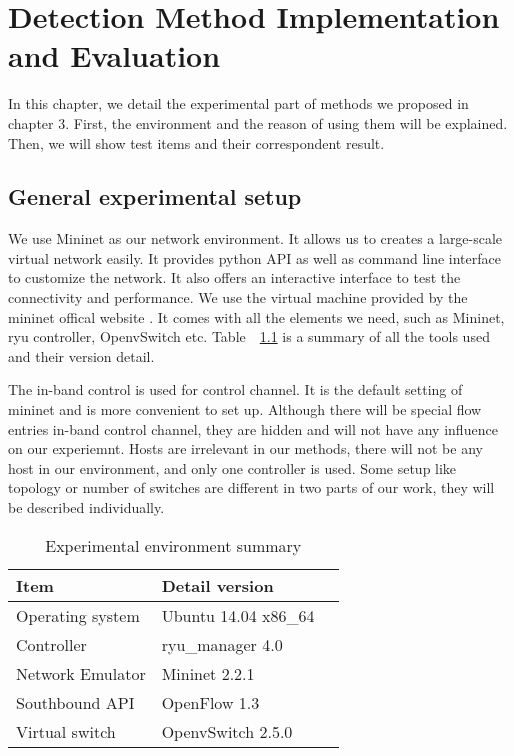 \chapter{Detection Method Implementation and Evaluation}
In this chapter, we detail the experimental part of methods we proposed in chapter 3. First, the environment and the reason of using them will be explained. Then, we will show test items and their correspondent result.

\section{General experimental setup}
We use Mininet as our network environment. It allows us to creates a large-scale virtual network easily. 
It provides python API as well as command line interface to customize the network. It also offers an interactive interface to test the connectivity and performance. We use the virtual machine provided by the mininet offical website \cite{Mininet}. It comes with all the elements we need, such as Mininet, ryu controller, OpenvSwitch etc. Table~~\ref{table:Experiment_table} is a summary of all the tools used and their version detail. 

The in-band control is used for control channel. It is the default setting of mininet and is more convenient to set up. Although there will be special flow entries in-band control channel, they are hidden and will not have any influence on our experiemnt. Hosts are irrelevant in our methods, there will not be any host in our environment, and only one controller is used. Some setup like topology or number of switches are different in two parts of our work, they will be described individually.

\begin{table}[H]
\centering
\caption{Experimental environment summary}
\begin{tabular}{|l|p{4cm}|p{4.5cm}}
\hline Item & Detail version \\
\hline Operating system & Ubuntu 14.04 x86\_64 \\
\hline Controller & ryu\_manager 4.0 \\
\hline Network Emulator & Mininet 2.2.1 \\
\hline Southbound API & OpenFlow 1.3 \\
\hline Virtual switch & OpenvSwitch 2.5.0 \\
\hline 
\end{tabular}
\label{table:Experiment_table}
\end{table}

